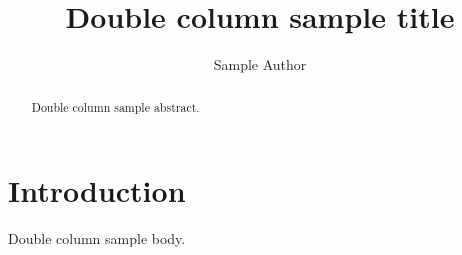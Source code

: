 \documentclass[a4paper,fleqn]{cas-dc}
\begin{document}
\title{Double column sample title}
\author[a]{Sample Author}
\begin{abstract}
Double column sample abstract.
\end{abstract}
\maketitle
\section{Introduction}
Double column sample body.

\end{document}
